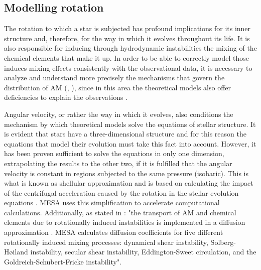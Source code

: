 \documentclass[fleqn,usenatbib]{mnras}
\begin{document}
\subsection{Modelling rotation}
The rotation to which a star is subjected has profound implications for its inner structure and, therefore, for the way in which it evolves throughout its life. It is also responsible for inducing through hydrodynamic instabilities the mixing of the chemical elements that make it up. In order to be able to correctly model those induces mixing effects consistently with the observational data, it is necessary to analyze and understand more precisely the mechanisms that govern the distribution of AM (\citet{Pinsonneault1997}, \citet{Maeder2000}), since in this area the theoretical models also offer deficiencies to explain the observations \citep{Denissenkov2007}. \par

Angular velocity, or rather the way in which it evolves, also conditions the mechanism by which theoretical models solve the equations of stellar structure. It is evident that stars have a three-dimensional structure and for this reason the equations that model their evolution must take this fact into account. However, it has been proven sufficient to solve the equations in only one dimension, extrapolating the results to the other two, if it is fulfilled that the angular velocity is constant in regions subjected to the same pressure (isobaric). This is what is known as shellular approximation \citep{Meynet1997} and is based on calculating the impact of the centrifugal acceleration caused by the rotation in the stellar evolution equations \citep{Endal1976}. MESA uses this simplification to accelerate computational calculations. Additionally, as stated in \citet{Paxton2013}: "the transport of AM and chemical elements due to rotationally induced instabilities is implemented in a diffusion approximation \citet{Endal1978}. MESA calculates diffusion coefficients for five different rotationally induced mixing processes: dynamical shear instability, Solberg-H{\o}iland instability, secular shear instability, Eddington-Sweet circulation, and the Goldreich-Schubert-Fricke instability".\par
\end{document}
